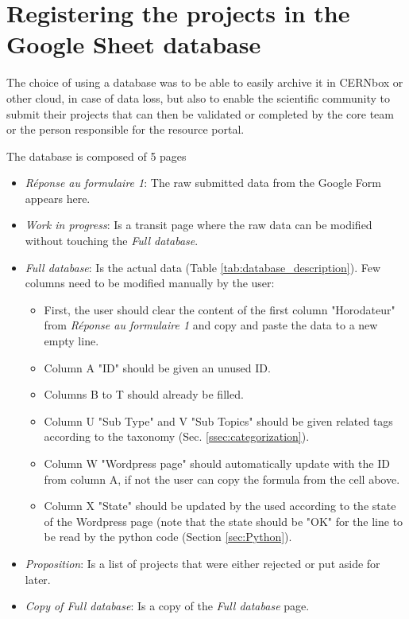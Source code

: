 \section{Registering the projects in the Google Sheet database}\label{sec:googlesheet}

The choice of using a database was to be able to easily archive it in CERNbox or other cloud, in case of data loss, but also to enable the scientific community to submit their projects that can then be validated or completed by the core team or the person responsible for the resource portal.

The database is composed of 5 pages
\begin{itemize}
    \item \textit{Réponse au formulaire 1}: The raw submitted data from the Google Form appears here.
    \item \textit{Work in progress}: Is a transit page where the raw data can be modified without touching the \textit{Full database}.
    \item \textit{Full database}: Is the actual data (Table \ref{tab:database_description}). Few columns need to be modified manually by the user: 
    \begin{itemize}
        \item First, the user should clear the content of the first column "Horodateur" from \textit{Réponse au formulaire 1} and copy and paste the data to a new empty line.
        \item Column A "ID" should be given an unused ID.
        \item Columns B to T should already be filled.
        \item Column U "Sub Type" and V "Sub Topics" should be given related tags according to the taxonomy (Sec. \ref{ssec:categorization}).
        \item Column W "Wordpress page" should automatically update with the ID from column A, if not the user can copy the formula from the cell above.
        \item Column X "State" should be updated by the used according to the state of the Wordpress page (note that the state should be "OK" for the line to be read by the python code (Section \ref{sec:Python}).
    \end{itemize}
    \item \textit{Proposition}: Is a list of projects that were either rejected or put aside for later.
    \item \textit{Copy of Full database}: Is a copy of the \textit{Full database} page.
\end{itemize}

